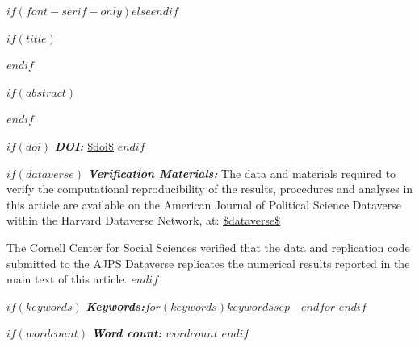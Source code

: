 $if(font-serif-only)$$else$\allsectionsfont{\sffamily}$endif$

$if(title)$
\maketitle
$endif$


$if(abstract)$
\begin{abstract}
$abstract$
\end{abstract}
$endif$

$if(doi)$
\textbf{\textit{DOI:}} \url{$doi$}
$endif$

$if(dataverse)$
\textbf{\textit{Verification Materials:}}
The data and materials required to verify the computational reproducibility of the results, procedures and analyses in this article are available on the American Journal of Political Science Dataverse within the Harvard Dataverse Network, at: 
\url{$dataverse$}


The Cornell Center for Social Sciences verified that the data and replication code submitted to the AJPS Dataverse replicates the numerical results reported in the main text of this article.
$endif$

$if(keywords)$
\textbf{\textit{Keywords:}}\quad $for(keywords)$$keywords$$sep$~\textbullet~$endfor$
$endif$

$if(wordcount)$
\textbf{\textit{Word count:}} $wordcount$
$endif$

